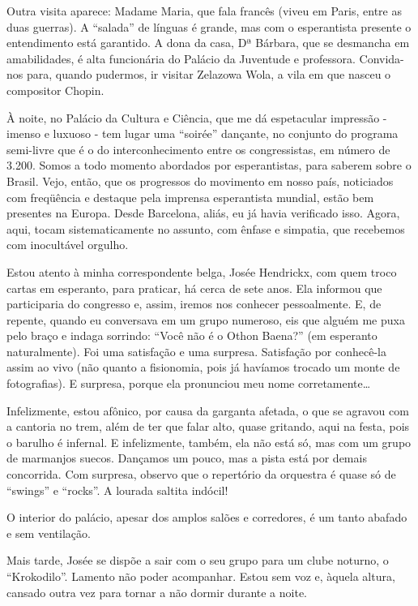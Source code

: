 Outra visita aparece: Madame Maria, que fala francês (viveu em Paris, entre as duas guerras). A “salada” de línguas é grande, mas com o esperantista presente o entendimento está garantido. A dona da casa, Dª Bárbara, que se desmancha em amabilidades, é alta funcionária do Palácio da Juventude e professora. Convida-nos para, quando pudermos, ir visitar Zelazowa Wola, a vila em que nasceu o compositor Chopin.

À noite, no Palácio da Cultura e Ciência, que me dá espetacular impressão - imenso e luxuoso - tem lugar uma “soirée” dançante, no conjunto do programa semi-livre que é o do interconhecimento entre os congressistas, em número de 3.200. Somos a todo momento abordados por esperantistas, para saberem sobre o Brasil. Vejo, então, que os progressos do movimento em nosso país, noticiados com freqüência e destaque pela imprensa esperantista mundial, estão bem presentes na Europa. Desde Barcelona, aliás, eu já havia verificado isso. Agora, aqui, tocam sistematicamente no assunto, com ênfase e simpatia, que recebemos com inocultável orgulho.

Estou atento à minha correspondente belga, Josée Hendrickx, com quem troco cartas em esperanto, para praticar, há cerca de sete anos. Ela informou que participaria do congresso e, assim, iremos nos conhecer pessoalmente. E, de repente, quando eu conversava em um grupo numeroso, eis que alguém me puxa pelo braço e indaga sorrindo: “Você não é o Othon Baena?” (em esperanto naturalmente). Foi uma satisfação e uma surpresa. Satisfação por conhecê-la assim ao vivo (não quanto a fisionomia, pois já havíamos trocado um monte de fotografias). E surpresa, porque ela pronunciou meu nome corretamente\ldots

Infelizmente, estou afônico, por causa da garganta afetada, o que se agravou com a cantoria no trem, além de ter que falar alto, quase gritando, aqui na festa, pois o barulho é infernal. E infelizmente, também, ela não está só, mas com um grupo de marmanjos suecos. Dançamos um pouco, mas a pista está por demais concorrida. Com surpresa, observo que o repertório da orquestra é quase só de “swings” e “rocks”. A lourada saltita indócil!

O interior do palácio, apesar dos amplos salões e corredores, é um tanto abafado e sem ventilação.

Mais tarde, Josée se dispõe a sair com o seu grupo para um clube noturno, o “Krokodilo”. Lamento não poder acompanhar. Estou sem voz e, àquela altura, cansado outra vez para tornar a não dormir durante a noite.

